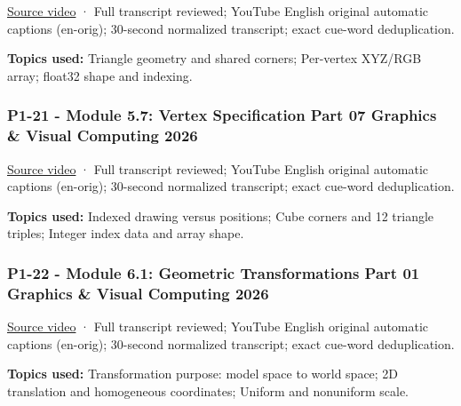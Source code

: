 \hypertarget{04-visual-computing-ii-ch036-p1-20---module-5.6-vertex-specification-part-06-graphics-visual-computing-2026}{}

\href{https://www.youtube.com/watch?v=S8gMtV0Zsa4}{Source video} · Full transcript reviewed; YouTube English original automatic captions (en-orig); 30-second normalized transcript; exact cue-word deduplication.

\textbf{Topics used:} Triangle geometry and shared corners; Per-vertex XYZ/RGB array; float32 shape and indexing.

\subsubsection{P1-21 - Module 5.7: Vertex Specification Part 07 Graphics \& Visual Computing 2026}\label{04-visual-computing-ii-ch036-p1-21---module-5.7-vertex-specification-part-07-graphics-visual-computing-2026}

\hypertarget{04-visual-computing-ii-ch036-p1-21---module-5.7-vertex-specification-part-07-graphics-visual-computing-2026}{}

\href{https://www.youtube.com/watch?v=ztaaLo_SVjQ}{Source video} · Full transcript reviewed; YouTube English original automatic captions (en-orig); 30-second normalized transcript; exact cue-word deduplication.

\textbf{Topics used:} Indexed drawing versus positions; Cube corners and 12 triangle triples; Integer index data and array shape.

\subsubsection{P1-22 - Module 6.1: Geometric Transformations Part 01 Graphics \& Visual Computing 2026}\label{04-visual-computing-ii-ch036-p1-22---module-6.1-geometric-transformations-part-01-graphics-visual-computing-2026}

\hypertarget{04-visual-computing-ii-ch036-p1-22---module-6.1-geometric-transformations-part-01-graphics-visual-computing-2026}{}

\href{https://www.youtube.com/watch?v=ynFh7s0SBpg}{Source video} · Full transcript reviewed; YouTube English original automatic captions (en-orig); 30-second normalized transcript; exact cue-word deduplication.

\textbf{Topics used:} Transformation purpose: model space to world space; 2D translation and homogeneous coordinates; Uniform and nonuniform scale.


